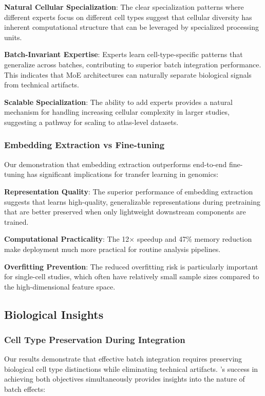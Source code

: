 \textbf{Natural Cellular Specialization}: The clear specialization patterns where different experts focus on different cell types suggest that cellular diversity has inherent computational structure that can be leveraged by specialized processing units.

\textbf{Batch-Invariant Expertise}: Experts learn cell-type-specific patterns that generalize across batches, contributing to superior batch integration performance. This indicates that MoE architectures can naturally separate biological signals from technical artifacts.

\textbf{Scalable Specialization}: The ability to add experts provides a natural mechanism for handling increasing cellular complexity in larger studies, suggesting a pathway for scaling to atlas-level datasets.

\subsubsection{Embedding Extraction vs Fine-tuning}

Our demonstration that embedding extraction outperforms end-to-end fine-tuning has significant implications for transfer learning in genomics:

\textbf{Representation Quality}: The superior performance of embedding extraction suggests that \bioformer{} learns high-quality, generalizable representations during pretraining that are better preserved when only lightweight downstream components are trained.

\textbf{Computational Practicality}: The 12× speedup and 47\% memory reduction make deployment much more practical for routine analysis pipelines.

\textbf{Overfitting Prevention}: The reduced overfitting risk is particularly important for single-cell studies, which often have relatively small sample sizes compared to the high-dimensional feature space.

\subsection{Biological Insights}

\subsubsection{Cell Type Preservation During Integration}

Our results demonstrate that effective batch integration requires preserving biological cell type distinctions while eliminating technical artifacts. \bioformer{}'s success in achieving both objectives simultaneously provides insights into the nature of batch effects:

